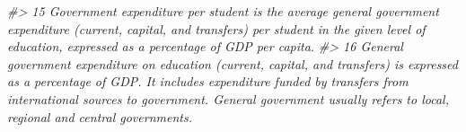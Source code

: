 \documentclass[
  xelatex, ja=standard]{bxjsbook}
\newenvironment{Shaded}{\begin{snugshade}}{\end{snugshade}}
\newcommand{\CommentTok}[1]{\textcolor[rgb]{0.56,0.35,0.01}{\textit{#1}}}
\theoremstyle{definition}
\theoremstyle{definition}
\theoremstyle{definition}
\theoremstyle{definition}
\theoremstyle{remark}
\begin{document}
\begin{Shaded}
\begin{Highlighting}[]
\CommentTok{\#\textgreater{} 15                                                                                                                                                                                                                                                                                                                                                                                                                                                                                                                                                                                                                                                                                                                                                                                                                                                                                                                                                                                                                                                                                                                                                                                                                                      Government expenditure per student is the average general government expenditure (current, capital, and transfers) per student in the given level of education, expressed as a percentage of GDP per capita.}
\CommentTok{\#\textgreater{} 16                                                                                                                                                                                                                                                                                                                                                                                                                                                                                                                                                                                                                                                                                                                                                                                                                                                                                                                                                                                                                                                                                                                                                            General government expenditure on education (current, capital, and transfers) is expressed as a percentage of GDP. It includes expenditure funded by transfers from international sources to government. General government usually refers to local, regional and central governments.}

\end{Highlighting}
\end{Shaded}
\end{document}
